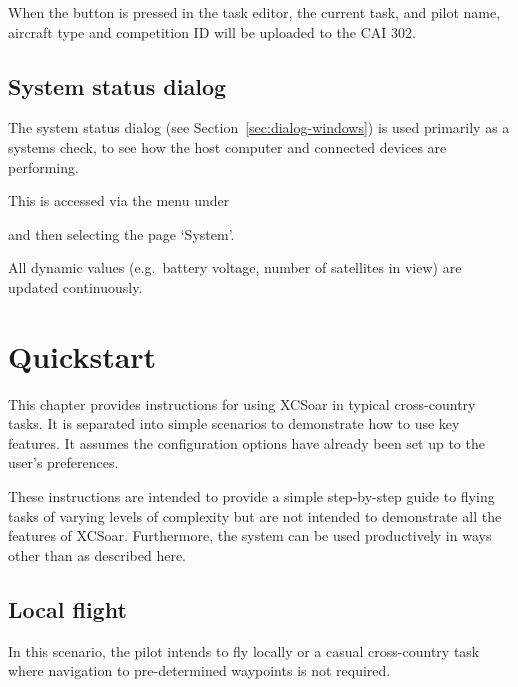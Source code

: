 \documentclass[a4paper,12pt]{refrep}
\begin{document}
When the  button is pressed in the task editor, the
current task, and pilot name, aircraft type and competition ID will be
uploaded to the CAI 302.


\section{System status dialog}\label{sec:system-status-dialog}

The system status dialog (see Section~\ref{sec:dialog-windows}) is
used primarily as a systems check, to see how the host computer and
connected devices are performing.

This is accessed via the menu under 
\begin{quote}
\blink{}\blink{}
\end{quote}
and then selecting the page `System'.

All dynamic values (e.g.\ battery voltage, number of satellites in
view) are updated continuously.

\chapter{Quickstart}\label{cha:quickstart}

This chapter provides instructions for using XCSoar in typical
cross-country tasks.  It is separated into simple scenarios to
demonstrate how to use key features.  It assumes the configuration
options have already been set up to the user's preferences.

These instructions are intended to provide a simple step-by-step guide
to flying tasks of varying levels of complexity but are not intended
to demonstrate all the features of XCSoar.  Furthermore, the system
can be used productively in ways other than as described here.

\section{Local flight}\label{sec:local-flight}

In this scenario, the pilot intends to fly locally or a casual
cross-country task where navigation to pre-determined waypoints is not
required.
\end{document}
